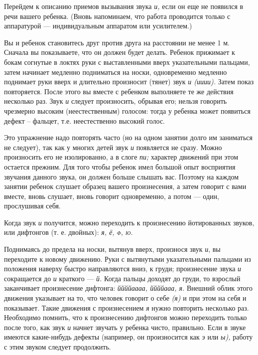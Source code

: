 \documentclass{book}
\renewcommand{\emph}[1]{\textit{#1}}
\begin{document}
Перейдем к описанию приемов вызывания звука \emph{и,} если он еще не
появился в речи вашего ребенка. (Вновь напоминаем, что работа проводится
только с аппаратурой --- индивидуальным аппаратом или усилителем.)

Вы и ребенок становитесь друг против друга на расстоянии не менее 1 м.
Сначала вы показываете, что он должен будет делать. Ребенок прижимает к
бокам согнутые в локтях руки с выставленными вверх указательными
пальцами, затем начинает медленно подниматься на носки, одновременно
медленно поднимает руки вверх и длительно произносит (тянет) звук
\emph{и (ииии).} Затем показ повторяется. После этого вы вместе с
ребенком выполняете те же действия несколько раз. Звук \emph{и} следует
произносить, обрывая его; нельзя говорить чрезмерно высоким
(неестественным) голосом: тогда у ребенка может появиться дефект --
фальцет, т.е. неестественно высокий голос.

Это упражнение надо повторять часто (но на одном занятии долго им
заниматься не следует), так как у многих детей звук \emph{и} появляется
не сразу. Можно произносить его не изолированно, а в слоге \emph{пи;}
характер движений при этом остается прежним. Для того чтобы ребенок имел
большой опыт восприятия звучания данного звука, он должен больше слышать
вас. Поэтому на каждом занятии ребенок слушает образец вашего
произнесения, а затем говорит с вами вместе, вновь слушает, вновь
говорит одновременно, а потом --- один, прослушивая себя.

Когда звук \emph{и} получится, можно переходить к произнесению
йотированных звуков, или дифтонгов (т. е. двойных): \emph{я, ё,
\textsc{ф, ю.}}

Поднимаясь до предела на носки, вытянув вверх, произнося звук \emph{и},
вы переходите к новому движению. Руки с вытянутыми указательными
пальцами из положения наверху быстро направляются вниз, к груди;
произнесение звука \emph{и} сокращается до \emph{и} краткого ---
\emph{й.} Когда пальцы доходят до груди, то взрослый заканчивает
произнесение дифтонга: \emph{ййййаааа, ййййааа, я.} Внешний облик этого
движения указывает на то, что человек говорит о себе \emph{(я)} и при
этом на себя и показывает. Такие движения с произнесением \emph{я} нужно
повторить несколько раз. Необходимо помнить, что к произнесению
дифтонгов можно переходить только после того, как звук \emph{и} начнет
звучать у ребенка чисто, правильно. Если в звуке имеются какие-нибудь
дефекты (например, он произносится как \emph{э} или \emph{ы),} работу с
этим звуком следует продолжить.
\end{document}
